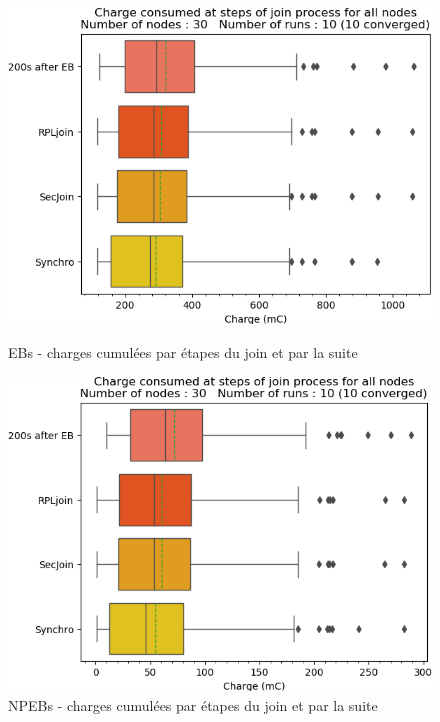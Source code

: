 \documentclass[]{report}
\begin{document}
\begin{figure}[!ht]
	\begin{minipage}{0.49\textwidth}
		\centering
		\includegraphics[width=\textwidth]{results/EB/phase_charges}
		\caption{EBs - charges cumulées par étapes du join et par la suite}
		\label{fig:EBcharges}
	\end{minipage}\hfill
	\begin{minipage}{0.5\textwidth}
		\centering
		\includegraphics[width=\textwidth]{results/NPEB/phase_charges}
		\caption{NPEBs - charges cumulées par étapes du join et par la suite}
		\label{fig:NPEBcharges}
	\end{minipage}	
\end{figure}
\end{document}
